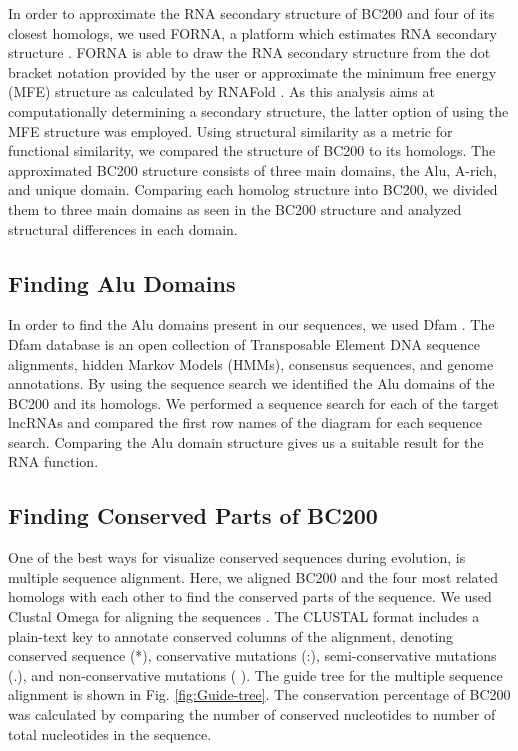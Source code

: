 \documentclass[conference, 11pt]{IEEEtran}
\begin{document}
In order to approximate the RNA secondary structure of BC200 and four of its closest homologs, we used FORNA, a platform which estimates RNA secondary structure \cite{kerpedjiev2015forna}. 
FORNA is able to draw the RNA secondary structure from the dot bracket notation provided by the user or approximate the minimum free energy (MFE) structure as calculated by RNAFold \cite{lorenz2011viennarna}. 
As this analysis aims at computationally determining a secondary structure, the latter option of using the MFE structure was employed. 
Using structural similarity as a metric for functional similarity, we compared the structure of BC200 to its homologs.
The approximated BC200 structure consists of three main domains, the Alu, A-rich, and unique domain. 
Comparing each homolog structure into BC200, we divided them to three main domains as seen in the BC200 structure and analyzed structural differences in each domain.

\subsection{Finding Alu Domains}

In order to find the Alu domains present in our sequences, we used Dfam \cite{storer2021dfam}. 
The Dfam database is an open collection of Transposable Element DNA sequence alignments, hidden Markov Models (HMMs), consensus sequences, and genome annotations. 
By using the sequence search we identified the Alu domains of the BC200 and its homologs. 
We performed a sequence search for each of the target lncRNAs and compared the first row names of the diagram for each sequence search. 
Comparing the Alu domain structure gives us a suitable result for the RNA function.

\subsection{Finding Conserved Parts of BC200}

One of the best ways for visualize conserved sequences during evolution, is multiple sequence alignment. 
Here, we aligned BC200 and the four most related homologs with each other to find the conserved parts of the sequence. 
We used Clustal Omega for aligning the sequences \cite{madeira2019embl}. 
The CLUSTAL format includes a plain-text key to annotate conserved columns of the alignment, denoting conserved sequence (*), conservative mutations (:), semi-conservative mutations (.), and non-conservative mutations ( ). 
The guide tree for the multiple sequence alignment is shown in Fig. \ref{fig:Guide-tree}. 
The conservation percentage of BC200 was calculated by comparing the number of conserved nucleotides to number of total nucleotides in the sequence.
\end{document}
